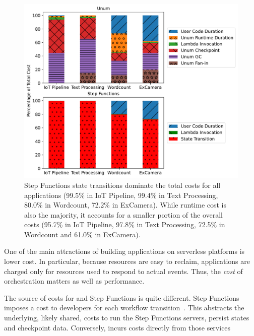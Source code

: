 \begin{figure}[t!]
    \centering
    \includegraphics[width=\columnwidth]{figures/AppCostBreakdown.pdf}
    \caption{Step Functions state transitions dominate the total costs for all
    applications (99.5\% in IoT Pipeline, 99.4\% in Text Processing, 80.0\% in
    Wordcount, 72.2\% in ExCamera). While \name{} runtime cost is also the
    majority, it accounts for a smaller portion of the overall costs (95.7\%
    in IoT Pipeline, 97.8\% in Text Processing, 72.5\%
    in Wordcount and 61.0\% in ExCamera).}
    \label{fig:cost-breakdown}
\end{figure}

One of the main attractions of building applications on serverless platforms
is  lower cost. In particular, because
resources are easy to reclaim, applications are charged only for resources
used to respond to actual events. Thus, the \emph{cost} of orchestration
matters as well as performance.

The source of costs for \name{} and Step Functions is quite different. Step
Functions imposes a cost to developers for each workflow
transition~\cite{aws-step-functions-pricing}. This abstracts the underlying, likely shared, costs to run the
Step Functions servers, persist states and checkpoint data. Conversely,
\name{} incurs costs directly from those services 

